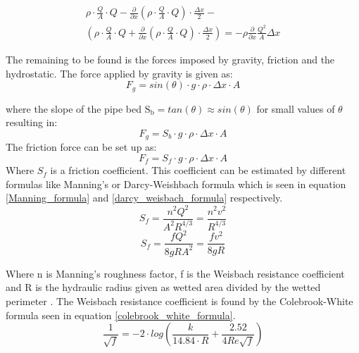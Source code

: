 \begin{equation}\label{mass_flow_speed}
\begin{array}{l}
\rho \cdot \frac{Q}{A} \cdot Q - \frac{\partial}{\partial x}\left(\rho \cdot \frac{Q}{A}  \cdot Q\right) \cdot \frac{\Delta x}{2} -\\ 
\left(\rho \cdot \frac{Q}{A}  \cdot Q + \frac{\partial}{\partial x}\left(\rho \cdot \frac{Q}{A}  \cdot Q\right) \cdot \frac{\Delta x}{2} \right)
= -  \rho\frac{\partial}{\partial x} \frac{Q^2}{A}\Delta x
\end{array}
\end{equation}

The remaining to be found is the forces imposed by gravity, friction and the hydrostatic.
The force applied by gravity is given as:
\begin{equation}
F_g = sin(\theta)\cdot g \cdot \rho \cdot \Delta x \cdot A
\label{gravity_force} 
\end{equation}

where the slope of the pipe bed $\text{S}_\text{b} = tan(\theta) \approx sin(\theta)$ for small values of $\theta$ resulting in:
\begin{equation}
F_g = S_b \cdot g \cdot \rho \cdot \Delta x \cdot A 
\end{equation}
The friction force can be set up as:
\begin{equation}
F_f = S_f \cdot g \cdot \rho \cdot \Delta x \cdot A 
\label{friction_force} 
\end{equation}
Where $S_f$ is a friction coefficient. This coefficient can be estimated by different formulas like Manning's or Darcy-Weishbach formula which is seen in equation \ref{Manning_formula} and \ref{darcy_weisbach_formula} respectively. 
\begin{equation}
	S_f = \frac{n^2 Q^2}{A^2R^{4/3}}= \frac{n^2 v^2}{R^{4/3}}
\label{Manning_formula}
\end{equation}
\begin{equation}
	S_f = \frac{f Q^2}{8gR A^2}= \frac{f v^2}{8gR}
\label{darcy_weisbach_formula}
\end{equation}

Where n is Manning's roughness factor, f is the Weisbach resistance coefficient and R is the hydraulic radius given as wetted area divided by the wetted perimeter \cite{stormwatercollectionsystems}.
The Weisbach resistance coefficient is found by the Colebrook-White formula seen in equation \ref{colebrook_white_formula}.
\begin{equation}
\frac{1}{\sqrt{f}} = -2\cdot log \left( \frac{k}{14.84 \cdot R}+ \frac{2.52}{4 Re \sqrt{f}} \right)
\label{colebrook_white_formula}
\end{equation}

